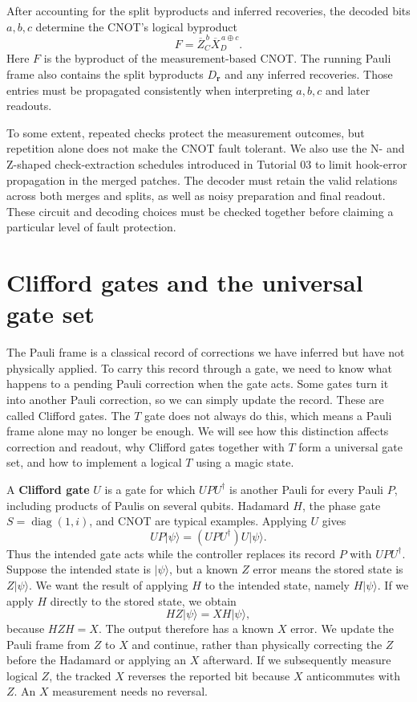 \documentclass[11pt,a4paper]{article}
\newcommand{\ket}[1]{\lvert #1\rangle}
\newcommand{\XL}{\overline X}
\newcommand{\ZL}{\overline Z}
\begin{document}
After accounting for the split byproducts and inferred recoveries, the decoded bits $a,b,c$ determine the CNOT's logical byproduct
\begin{equation}\label{eq:cnotframe}
F=\ZL_C^{\,b}\XL_D^{\,a\oplus c}.
\end{equation}
Here $F$ is the byproduct of the measurement-based CNOT. The running Pauli frame also contains the split byproducts $D_{\mathbf r}$ and any inferred recoveries. Those entries must be propagated consistently when interpreting $a,b,c$ and later readouts.

To some extent, repeated checks protect the measurement outcomes, but repetition alone
does not make the CNOT fault tolerant. We also use the N- and Z-shaped
check-extraction schedules introduced in Tutorial 03 to limit hook-error
propagation in the merged patches. The decoder must retain the valid
relations across both merges and splits, as well as noisy preparation
and final readout. These circuit and decoding choices must be checked
together before claiming a particular level of fault protection.

\section{Clifford gates and the universal gate set}\label{sec:frame}
The Pauli frame is a classical record of corrections we have inferred but have not physically applied. To carry this record through a gate, we need to know what happens to a pending Pauli correction when the gate acts. Some gates turn it into another Pauli correction, so we can simply update the record. These are called Clifford gates. The \(T\) gate does not always do this, which means a Pauli frame alone may no longer be enough. We will see how this distinction affects correction and readout, why Clifford gates together with \(T\) form a universal gate set, and how to implement a logical \(T\) using a magic state.

A \textbf{Clifford gate} $U$ is a gate for which $UPU^\dagger$ is another Pauli for every Pauli $P$, including products of Paulis on several qubits. Hadamard $H$, the phase gate $S=\operatorname{diag}(1,i)$, and CNOT are typical examples. Applying $U$ gives
\begin{equation}\label{eq:frame}
UP\ket\psi=(UPU^\dagger)U\ket\psi.
\end{equation}
Thus the intended gate acts while the controller replaces its record $P$ with $UPU^\dagger$. Suppose the intended state is $\ket{\psi}$, but a known $Z$ error
means the stored state is $Z\ket{\psi}$. We want the result of applying $H$ to the intended state, namely $H\ket{\psi}$. If we apply $H$
directly to the stored state, we obtain
\[
HZ\ket{\psi}=XH\ket{\psi},
\]
because $HZH=X$. The output therefore has a known $X$ error. We
update the Pauli frame from $Z$ to $X$ and continue, rather than
physically correcting the $Z$ before the Hadamard or applying an $X$
afterward. If we subsequently measure logical $Z$, the tracked $X$ reverses
the reported bit because $X$ anticommutes with $Z$. An $X$
measurement needs no reversal.
\end{document}
